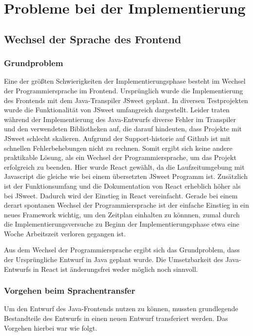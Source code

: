 \section{Probleme bei der Implementierung}

\subsection{Wechsel der Sprache des Frontend}
\subsubsection{Grundproblem}
Eine der größten Schwierigkeiten der Implementierungsphase besteht im Wechsel der Programmiersprache im Frontend.
Ursprünglich wurde die Implementierung des Frontends mit dem Java-Transpiler JSweet geplant.
In diversen Testprojekten wurde die Funktionalität von JSweet umfangreich dargestellt.
Leider traten während der Implementierung des Java-Entwurfs diverse Fehler im Transpiler und den verwendeten Bibliotheken auf, die darauf hindeuten, dass Projekte mit JSweet schlecht skalieren.
Aufgrund der Support-historie auf Github ist mit schnellen Fehlerbehebungen nicht zu rechnen.
Somit ergibt sich keine andere praktikable Lösung, als ein Wechsel der Programmiersprache, um das Projekt erfolgreich zu beenden.
Hier wurde React gewählt, da die Laufzeitumgebung mit Javascript die gleiche wie bei einem übersetzten JSweet Programm ist.
Zusätzlich ist der Funktionsumfang und die Dokumentation von React erheblich höher als bei JSweet.
Dadurch wird der Einstieg in React vereinfacht.
Gerade bei einem derart spontanen Wechsel der Programmiersprache ist der einfache Einstieg in ein neues Framework wichtig, um den Zeitplan einhalten zu könnnen, zumal durch die Implementierungsversuche zu Beginn der Implementierungsphase etwa eine Woche Arbeitszeit verloren gegangen ist.

Aus dem Wechsel der Programmiersprache ergibt sich das Grundproblem, dass der Ursprüngliche Entwurf in Java geplant wurde. Die Umsetzbarkeit des Java-Entwurfs in React ist änderungsfrei weder möglich noch sinnvoll.

\subsubsection{Vorgehen beim Sprachentransfer}
Um den Entwurf des Java-Frontends nutzen zu können, mussten grundlegende Bestandteile des Entwurfs in einen neuen Entwurf transferiert werden.
Das Vorgehen hierbei war wie folgt.


